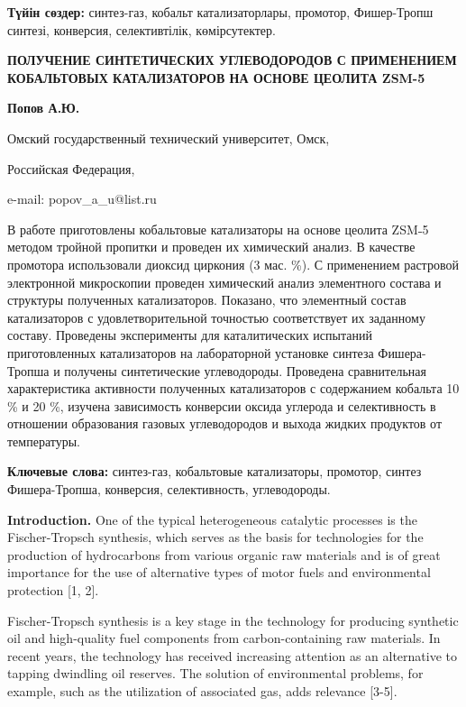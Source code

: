 {\bfseries Түйін сөздер:} синтез-газ, кобальт катализаторлары, промотор,
Фишер-Тропш синтезі, конверсия, селективтілік, көмірсутектер.

{\bfseries ПОЛУЧЕНИЕ СИНТЕТИЧЕСКИХ УГЛЕВОДОРОДОВ С ПРИМЕНЕНИЕМ КОБАЛЬТОВЫХ
КАТАЛИЗАТОРОВ НА ОСНОВЕ ЦЕОЛИТА ZSM-5}

{\bfseries Попов А.Ю.}

Омский государственный технический университет, Омск,

Российская Федерация,

e-mail: popov\_a\_u@list.ru

В работе приготовлены кобальтовые катализаторы на основе цеолита ZSM˗5
методом тройной пропитки и проведен их химический анализ. В качестве
промотора использовали диоксид циркония (3 мас. \%). С применением
растровой электронной микроскопии проведен химический анализ элементного
состава и структуры полученных катализаторов. Показано, что элементный
состав катализаторов с удовлетворительной точностью соответствует их
заданному составу. Проведены эксперименты для каталитических испытаний
приготовленных катализаторов на лабораторной установке синтеза
Фишера-Тропша и получены синтетические углеводороды. Проведена
сравнительная характеристика активности полученных катализаторов с
содержанием кобальта 10 \% и 20 \%, изучена зависимость конверсии оксида
углерода и селективность в отношении образования газовых углеводородов и
выхода жидких продуктов от температуры.

{\bfseries Ключевые слова:} синтез-газ, кобальтовые катализаторы, промотор,
синтез Фишера-Тропша, конверсия, селективность, углеводороды.

{\bfseries Introduction.} One of the typical heterogeneous catalytic
processes is the Fischer-Tropsch synthesis, which serves as the basis
for technologies for the production of hydrocarbons from various organic
raw materials and is of great importance for the use of alternative
types of motor fuels and environmental protection {[}1, 2{]}.

Fischer-Tropsch synthesis is a key stage in the technology for producing
synthetic oil and high-quality fuel components from carbon-containing
raw materials. In recent years, the technology has received increasing
attention as an alternative to tapping dwindling oil reserves. The
solution of environmental problems, for example, such as the utilization
of associated gas, adds relevance {[}3-5{]}.

